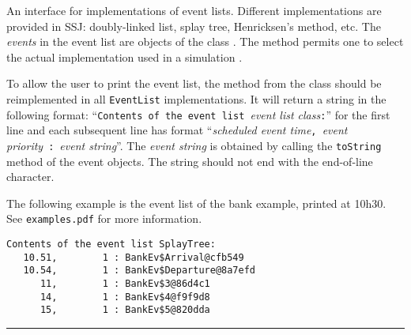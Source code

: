 
An interface for implementations of event lists.
Different implementations are provided in SSJ:
doubly-linked list, splay tree, Henricksen's method, etc.
The {\em events\/} in the event list are objects of the class
.
The method 
permits one to select
the actual implementation used in a simulation \cite{sKIN85a}.

To allow the user to print the event list, the 
 method
from the  class should be reimplemented in all {\tt EventList}
implementations.  It will return a string in the following format:
``{\tt Contents of the event list }\emph{event list class}{\tt :}'' for the first line and
each subsequent line has format 
``\emph{scheduled event time}{\tt , }\emph{event priority}~{\tt :}~\emph{event string}''.
The \emph{event string} is obtained by calling the
{\tt toString} method of the event objects.
The string should not end with the end-of-line character.

The following example is the event list of the bank example,
printed at 10h30.  See {\tt examples.pdf} for more information.

\begin{verbatim}
Contents of the event list SplayTree:
   10.51,        1 : BankEv$Arrival@cfb549
   10.54,        1 : BankEv$Departure@8a7efd
      11,        1 : BankEv$3@86d4c1
      14,        1 : BankEv$4@f9f9d8
      15,        1 : BankEv$5@820dda
\end{verbatim}


\bigskip\hrule

